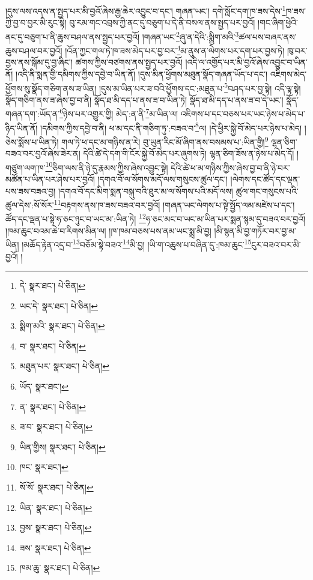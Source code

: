 །དུས་ལས་འདས་ན་སྤྱད་པར་མི་བྱའོ་ཞེས་རྒྱ་ཆེར་འབྱུང་བ་དང་། གཞན་ཡང་། དགེ་སློང་དག་ཁ་ཟས་དེས་\footnote{དེ་  སྣར་ཐང་།  པེ་ཅིན། }ཁ་ཟས་ཀྱི་བྱ་བ་བྱར་མི་རུང་སྟེ། བུ་རམ་གང་འབྲས་ཀྱི་ནང་དུ་བཅུག་པ་དེ་ནི་བསལ་ནས་སྤྱད་པར་བྱའོ། །གང་ཞིག་ཕྱེའི་ནང་དུ་བཅུག་པ་ནི་ཆུས་བཤལ་ནས་སྤྱད་པར་བྱའོ། །གཞན་ཡང་\footnote{ཡང་དེ་  སྣར་ཐང་།  པེ་ཅིན། }ཞུ་ན་དེའི་:སྨྱིག་མའི་\footnote{སྨིག་མའི་  སྣར་ཐང་།  པེ་ཅིན། }ཚལ་པས་བཞར་ནས་ཆུས་བཤལ་བར་བྱའོ། །འོན་ཀྱང་གལ་ཏེ་ཁ་ཟས་མེད་པར་བྱ་བར་\footnote{བ་  སྣར་ཐང་།  པེ་ཅིན། }མ་ནུས་ན་ལེགས་པར་དག་པར་བྱས་ཏེ། ཁུ་བར་བྱས་ནས་སྐོམ་དུ་བྱ་ཞིང་། ཚགས་ཀྱིས་བཙགས་ནས་སྤྱད་པར་བྱའོ། །འདི་ལ་འགྱོད་པར་མི་བྱའོ་ཞེས་འབྱུང་བ་ཡིན་ནོ། །འདི་ནི་སྨན་གྱི་དམིགས་ཀྱིས་དབྱེ་བ་ཡིན་ནོ། །དུས་མིན་ཕྱོགས་མཐུན་སྣོད་གཞན་ཡོད་པ་དང་། འཇིགས་མེད་ཕྱོགས་སུ་སྣོད་གཅིག་ནས་ཟ་ཡིན། །དུས་མ་ཡིན་པར་ཟ་བའི་ཕྱོགས་དང་:མཐུན་པ་\footnote{མཐུན་པར་  སྣར་ཐང་།  པེ་ཅིན། }བཤད་པར་བྱ་སྟེ། འདི་ལྟ་སྟེ། སྣོད་གཅིག་ནས་ཟ་ཞེས་བྱ་བ་ནི། སྣོད་ཐ་མི་དད་པ་ནས་ཟ་བ་ཡིན་ཏེ། སྣོད་ཐ་མི་དད་པ་ནས་ཟ་བ་དེ་ཡང་། སྣོད་གཞན་དག་:ཡོད་ན་\footnote{ཡོད་  སྣར་ཐང་། }ཉེས་པར་འགྱུར་གྱི། མེད་:ན་ནི་\footnote{ན་  སྣར་ཐང་།  པེ་ཅིན། }མ་ཡིན་ལ། འཇིགས་པ་དང་བཅས་པར་ཡང་ཉེས་པ་མེད་པ་ཉིད་ཡིན་ནོ། །དམིགས་ཀྱིས་དབྱེ་བ་ནི། ཕ་མ་དང་ནི་གཅིག་ཏུ་:བཟའ་བ་\footnote{ཟ་བ་  སྣར་ཐང་།  པེ་ཅིན། }ལ། །དེ་ཕྱིར་སྐྱེ་བོ་མེད་པར་ཉེས་པ་མེད། །ཅེས་སྨོས་པ་ཡིན་ཏེ། གལ་ཏེ་ཕ་དང་མ་གཉིས་ན་རེ། བུ་ཡུན་རིང་མོ་ཞིག་ནས་བསམས་པ་:ཡིན་གྱི།\footnote{ཡིན་གྱིས།  སྣར་ཐང་།  པེ་ཅིན། } ལྷན་ཅིག་བཟའ་བར་བྱའོ་ཞེས་ཟེར་ན། དེའི་ཚེ་དེ་དག་གི་ངོར་སྐྱེ་བོ་མེད་པར་ཞུགས་ཏེ། ལྷན་ཅིག་ཟོས་ན་ཉེས་པ་མེད་དོ། །གཙུག་ལག་ཁ་\footnote{ཁང་  སྣར་ཐང་། }ཅིག་ལས་ནི་ཉེ་དུ་རྣམས་ཀྱིས་ཞེས་འབྱུང་སྟེ། དེའི་ཚེ་ཕ་མ་གཉིས་ཀྱིས་ཞེས་བྱ་བ་ནི་ཉེ་བར་མཚོན་པ་ཡིན་པར་ཤེས་པར་བྱའོ། །དགའ་བོ་ལ་སོགས་མདོ་ལས་གསུངས་ཚུལ་དང་། །ལེགས་དང་ཚོད་དང་ལྡན་པས་ཟས་བཟའ་བྱ། །དགའ་བོ་དང་མིག་སྨན་བསྐུ་བའི་ཐུར་མ་ལ་སོགས་པའི་མདོ་ལས། ཚུལ་གང་གསུངས་པའི་ཚུལ་དེས་:སོ་སོར་\footnote{སོ་སོ་  སྣར་ཐང་།  པེ་ཅིན། }བརྟགས་ནས་ཁ་ཟས་བཟའ་བར་བྱའོ། །གཞན་ཡང་ལེགས་པ་སྟེ་སྤྱོད་ལམ་མཛེས་པ་དང་། ཚོད་དང་ལྡན་པ་སྟེ་ཧ་ཅང་ཉུང་བ་ཡང་མ་:ཡིན་ཏེ། \footnote{ཡིན་  སྣར་ཐང་།  པེ་ཅིན། }ཧ་ཅང་མང་བ་ཡང་མ་ཡིན་པར་སྨན་སྙམ་དུ་བཟའ་བར་བྱའོ། །ཁམ་ཆུང་བའམ་ཆེ་བ་རིགས་མིན་ལ། །ཁ་ཁམ་བཅས་པས་ནམ་ཡང་སྨྲ་མི་བྱ། །མི་སྙན་མི་བྱ་གཏོར་བར་བྱ་མ་ཡིན། །མཆོད་རྟེན་འདྲ་བ་\footnote{བྱས་  སྣར་ཐང་།  པེ་ཅིན། }བཅོམ་སྟེ་བཟའ་\footnote{ཟས་  སྣར་ཐང་།  པེ་ཅིན། }མི་བྱ། །ཡི་ག་འཆུས་པ་བཞིན་དུ་:ཁམ་ཆུང་\footnote{ཁམ་ཆུ་  སྣར་ཐང་།  པེ་ཅིན། }ངུར་བཟའ་བར་མི་བྱའོ། །
